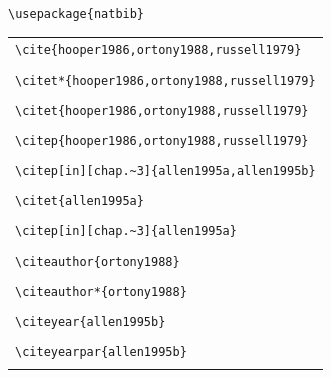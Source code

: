 ﻿\documentclass{article}
\begin{document}
\verb#\usepackage{natbib}#\\

\begin{center}
\begin{tabular}{l}
\verb#\cite{hooper1986,ortony1988,russell1979}# \\
\cite{hooper1986,ortony1988,russell1979}  \\\hline 
\verb#\citet*{hooper1986,ortony1988,russell1979}# \\
 \citet*{hooper1986,ortony1988,russell1979}  \\\hline
\verb#\citet{hooper1986,ortony1988,russell1979}# \\
 \citet{hooper1986,ortony1988,russell1979}  \\\hline
\verb#\citep{hooper1986,ortony1988,russell1979}# \\
 \citep{hooper1986,ortony1988,russell1979}  \\\hline
[Fails in 1.9.15] \verb#\citep[in][chap.~3]{allen1995a,allen1995b}# \\
 \citep[in][chap.~3]{allen1995a,allen1995b} \\\hline
\verb#\citet{allen1995a}# \\
 \citet{allen1995a} \\\hline
\verb#\citep[in][chap.~3]{allen1995a}# \\
 \citep[in][chap.~3]{allen1995a} \\\hline
\verb#\citeauthor{ortony1988}# \\
 \citeauthor{ortony1988} \\\hline
\verb#\citeauthor*{ortony1988}# \\
 \citeauthor*{ortony1988} \\\hline
\verb#\citeyear{allen1995b}# \\
 \citeyear{allen1995b} \\\hline
\verb#\citeyearpar{allen1995b}# \\
 \citeyearpar{allen1995b} \\\hline
\end{tabular}
\end{center}
\end{document}
